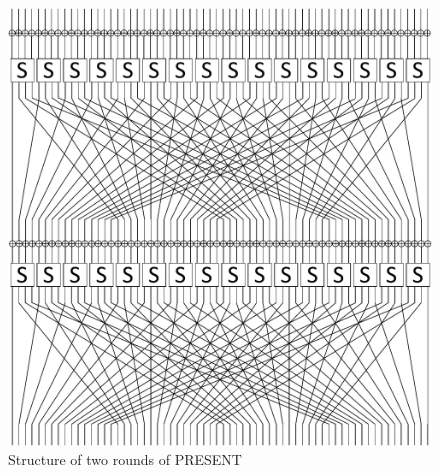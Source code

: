 \documentclass[10pt, conference, compsocconf]{IEEEtran}  %
\numberwithin{Definition}{section}
\numberwithin{Claim}{section}
\begin{document}
\begin{figure}
	\centering
	\includegraphics[scale=0.3]{present_structure}
    \caption{Structure of two rounds of PRESENT}
    \label{fig:present_structure}
\end{figure}
\end{document}
